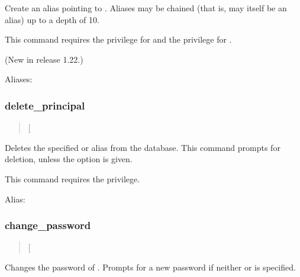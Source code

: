 \documentclass[letterpaper,10pt,english]{sphinxmanual}
\begin{document}
\sphinxAtStartPar
Create an alias  pointing to .  Aliases may
be chained (that is,  may itself be an alias) up to a
depth of 10.

\sphinxAtStartPar
This command requires the  privilege for  and the
 privilege for .

\sphinxAtStartPar
(New in release 1.22.)

\sphinxAtStartPar
Aliases: 


\subsubsection{delete\_principal}
\label{\detokenize{admin/admin_commands/kadmin_local:delete-principal}}\label{\detokenize{admin/admin_commands/kadmin_local:id5}}\begin{quote}

\sphinxAtStartPar
{} {[}\sphinxstylestrong{\sphinxhyphen{}force}{]} 
\end{quote}

\sphinxAtStartPar
Deletes the specified  or alias from the database.  This
command prompts for deletion, unless the  option is given.

\sphinxAtStartPar
This command requires the  privilege.

\sphinxAtStartPar
Alias: 


\subsubsection{change\_password}
\label{\detokenize{admin/admin_commands/kadmin_local:change-password}}\label{\detokenize{admin/admin_commands/kadmin_local:id6}}\begin{quote}

\sphinxAtStartPar
{} {[}\sphinxstyleemphasis{options}{]} 
\end{quote}

\sphinxAtStartPar
Changes the password of .  Prompts for a new password if
neither  or  is specified.
\end{document}
